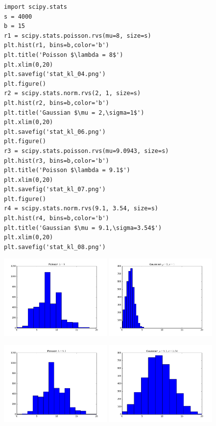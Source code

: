\documentclass[12pt,fleqn]{article}\usepackage{../../common}
\begin{document}
\begin{verbatim}
import scipy.stats
s = 4000
b = 15
r1 = scipy.stats.poisson.rvs(mu=8, size=s)
plt.hist(r1, bins=b,color='b')
plt.title('Poisson $\lambda = 8$')
plt.xlim(0,20)
plt.savefig('stat_kl_04.png')
plt.figure()
r2 = scipy.stats.norm.rvs(2, 1, size=s)
plt.hist(r2, bins=b,color='b')
plt.title('Gaussian $\mu = 2,\sigma=1$')
plt.xlim(0,20)
plt.savefig('stat_kl_06.png')
plt.figure()
r3 = scipy.stats.poisson.rvs(mu=9.0943, size=s)
plt.hist(r3, bins=b,color='b')
plt.title('Poisson $\lambda = 9.1$')
plt.xlim(0,20)
plt.savefig('stat_kl_07.png')
plt.figure()
r4 = scipy.stats.norm.rvs(9.1, 3.54, size=s)
plt.hist(r4, bins=b,color='b')
plt.title('Gaussian $\mu = 9.1,\sigma=3.54$')
plt.xlim(0,20)
plt.savefig('stat_kl_08.png')
\end{verbatim}

\includegraphics[width=15em]{stat_kl_04.png}
\includegraphics[width=15em]{stat_kl_06.png}

\includegraphics[width=15em]{stat_kl_07.png}
\includegraphics[width=15em]{stat_kl_08.png}
\end{document}
